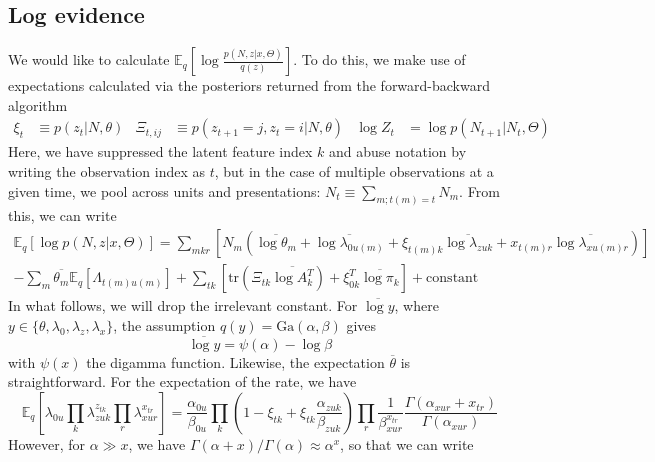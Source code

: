\documentclass[10pt,letterpaper]{article}
\begin{document}
\subsection{Log evidence}
We would like to calculate $\mathbb{E}_{q}\left[ \log \frac{p(N, z|x, \Theta)}{q(z)}\right]$. To do this, we make use of expectations calculated via the posteriors returned from the forward-backward algorithm
\begin{align}
    \xi_{t} &\equiv p(z_{t}|N, \theta) &
    \Xi_{t, ij} &\equiv p(z_{t+1} = j, z_{t} = i|N, \theta) &
    \log Z_{t} &= \log p(N_{t+1}|N_{t}, \Theta)
\end{align}
Here, we have suppressed the latent feature index $k$ and abuse notation by writing the observation index as $t$, but in the case of multiple observations at a given time, we pool across units and presentations: $N_t \equiv \sum_{m; t(m) = t} N_m$. From this, we can write
\begin{multline}
     \mathbb{E}_{q}\left[ \log p(N, z|x, \Theta) \right] =
     \sum_{mkr} \left[N_m \left(
        \overline{\log \theta_m} + \overline{\log \lambda_{0u(m)}} +
        \xi_{t(m)k}\overline{\log \lambda_{zuk}} +
        x_{t(m)r} \overline{\log \lambda_{xu(m)r}}
     \right) \right] \\
     - \sum_m \overline{\theta_m} \mathbb{E}_q\left[\Lambda_{t(m)u(m)} \right]      + \sum_{tk} \left[ \text{tr}\left(\Xi_{tk} \overline{\log A_k^T} \right)
     + \xi_{0k}^T \overline{\log \pi_k}
     \right]
    + \text{constant}
 \end{multline}
In what follows, we will drop the irrelevant constant. For $\overline{\log y}$, where $y \in \lbrace \theta, \lambda_0, \lambda_z, \lambda_x \rbrace$, the assumption $q(y) = \text{Ga}(\alpha, \beta)$ gives
\begin{equation}
    \overline{\log y} = \psi(\alpha) - \log \beta
\end{equation}
with $\psi(x)$ the digamma function. Likewise, the expectation $\overline{\theta}$ is straightforward. For the expectation of the rate, we have
\begin{equation}
    \label{eff_rate}
    \mathbb{E}_q\left[
        \lambda_{0u} \prod_k \lambda_{zuk}^{z_{tk}} \prod_r \lambda_{xur}^{x_{tr}}
    \right] = \frac{\alpha_{0u}}{\beta_{0u}}
    \prod_k \left(1 - \xi_{tk} + \xi_{tk} \frac{\alpha_{zuk}}{\beta_{zuk}} \right)
    \prod_r \frac{1}{\beta_{xur}^{x_{tr}}} \frac{\Gamma(\alpha_{xur} + x_{tr})}{\Gamma(\alpha_{xur})}
\end{equation}
However, for $\alpha \gg x$, we have $\Gamma(\alpha + x)/\Gamma(\alpha) \approx \alpha^x$, so that we can write
\end{document}
